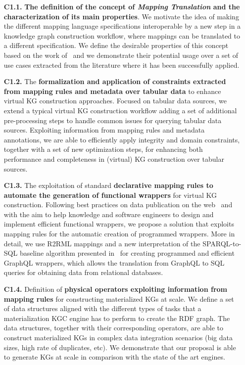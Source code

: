 \begin{enumerate}
    \item[\textbf{C1.1.}] \textbf{The definition of the concept of \textit{Mapping Translation} and the characterization of its main properties}. We motivate the idea of making the different mapping language specifications interoperable by a new step in a knowledge graph construction workflow, where mappings can be translated to a different specification. We define the desirable properties of this concept based on the work of~\citep{hartig2017foundations} and we demonstrate their potential usage over a set of use cases extracted from the literature where it has been successfully applied.
    \item[\textbf{C1.2.}] The \textbf{formalization and application of constraints extracted from mapping rules and metadata over tabular data} to enhance virtual KG construction approaches. Focused on tabular data sources, we extend a typical virtual KG construction workflow adding a set of additional pre-processing steps to handle common issues for querying tabular data sources. Exploiting information from mapping rules and metadata annotations, we are able to efficiently apply integrity and domain constraints, together with a set of new optimization steps, for enhancing both performance and completeness in (virtual) KG construction over tabular sources.
    \item[\textbf{C1.3.}] The exploitation of standard \textbf{declarative mapping rules to automate the generation of functional wrappers} for virtual KG construction. Following best practices on data publication on the web~\citep{bizer2011linked} and with the aim to help knowledge and software engineers to design and implement efficient functional wrappers, we propose a solution that exploits mapping rules for the automatic creation of programmed wrappers. More in detail, we use R2RML mappings and a new interpretation of the SPARQL-to-SQL baseline algorithm presented in~\citep{chebotko2009semantics} for creating programmed and efficient GraphQL wrappers, which allows the translation from GraphQL to SQL queries for obtaining data from relational databases.
    \item[\textbf{C1.4.}] Definition of \textbf{physical operators exploiting information from mapping rules} for constructing materialized KGs at scale. We define a set of data structures aligned with the different types of tasks that a materialization KGC engine has to perform to create the RDF graph. The data structures, together with their corresponding operators, are able to construct materialized KGs in complex data integration scenarios (big data sizes, high rate of duplicates, etc). We demonstrate that our proposal is able to generate KGs at scale in comparison with the state of the art engines. 

\end{enumerate}
